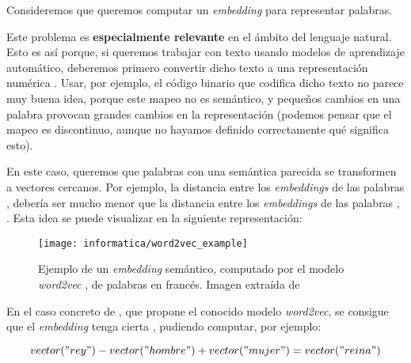 \begin{ejemplo}
    Consideremos que queremos computar un \textit{embedding} para representar palabras.

    Este problema es \textbf{especialmente relevante} en el ámbito del lenguaje natural. Esto es así porque, si queremos trabajar con texto usando modelos de aprendizaje automático, deberemos primero convertir dicho texto a una representación numérica \cite{informatica:word_embeddings_survey}. Usar, por ejemplo, el código binario que codifica dicho texto no parece muy buena idea, porque este mapeo no es semántico, y pequeños cambios en una palabra provocan grandes cambios en la representación (podemos pensar que el mapeo es discontinuo, aunque no hayamos definido correctamente qué significa esto).

    En este caso, queremos que palabras con una semántica parecida se transformen a vectores cercanos. Por ejemplo, la distancia entre los \textit{embeddings} de las palabras ,  debería ser mucho menor que la distancia entre los \textit{embeddings} de las palabras , . Esta idea se puede visualizar en la siguiente representación:

    \begin{figure}[H]
        \centering
        \texttt{[image: informatica/word2vec\_example]}
        \caption{Ejemplo de un \textit{embedding} semántico, computado por el modelo \textit{word2vec} \cite{informatica:word2vec}, de palabras en francés. Imagen extraída de \cite{informatica:word2vec_cran_package}}
    \end{figure}

    En el caso concreto de \cite{informatica:word2vec}, que propone el conocido modelo \textit{word2vec}, se consigue que el \textit{embedding} tenga cierta , pudiendo computar, por ejemplo:

    \begin{equation}
        vector("rey") - vector("hombre") + vector("mujer") = vector("reina")
    \end{equation}
\end{ejemplo}

